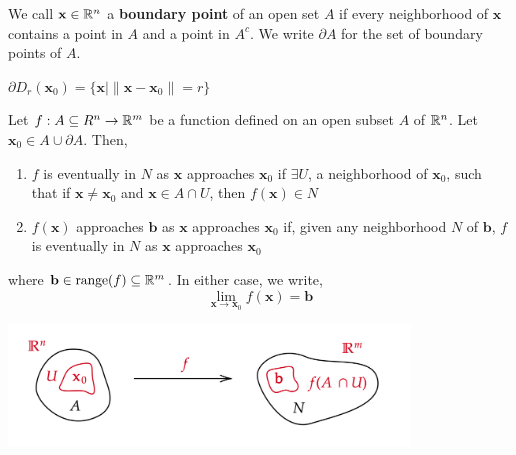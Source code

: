 \begin{defn}
     We call $\mathbf{x} \in \mathbb{R}^n$ a \textbf{boundary point} of an open set $A$ if every neighborhood of $\mathbf{x}$ contains a point in $A$ and a point in $A^c$. We write $\partial A$ for the set of boundary points of $A$.
\end{defn}

\begin{cor}
    $\partial D_r(\mathbf{x}_0) = \{\mathbf{x} \mid \|\mathbf{x} - \mathbf{x}_0\| = r\}$
\end{cor}

\begin{defn}
    Let $f: A \subseteq R^n \rightarrow \mathbb{R}^m$ be a function defined on an open subset $A$ of $\mathbb{R}^n$. Let $\mathbf{x}_0 \in A \cup \partial A$. Then,
    \begin{enumerate}
        \item \sloppy $f$ is eventually in $N$ as $\mathbf{x}$ approaches $\mathbf{x}_0$ if $\exists U$, a neighborhood of $\mathbf{x}_0$, such that if $\mathbf{x} \neq \mathbf{x}_0$ and $\mathbf{x} \in A \cap U$, then $f(\mathbf{x}) \in N$
        \item $f(\mathbf{x})$ approaches $\mathbf{b}$ as $\mathbf{x}$ approaches $\mathbf{x}_0$ if, given any neighborhood $N$ of $\mathbf{b}$, $f$ is eventually in $N$ as $\mathbf{x}$ approaches $\mathbf{x}_0$ 
    \end{enumerate}
    where $\mathbf{b} \in \text{range}(f) \subseteq \mathbb{R}^m$. In either case, we write,
    \[\lim_{\mathbf{x} \rightarrow \mathbf{x}_0} f(\mathbf{x}) = \mathbf{b}\]
\end{defn}

\begin{center}
   \includegraphics[width=0.8\textwidth]{figures/wk-1/fig-19.png}
\end{center}
    
